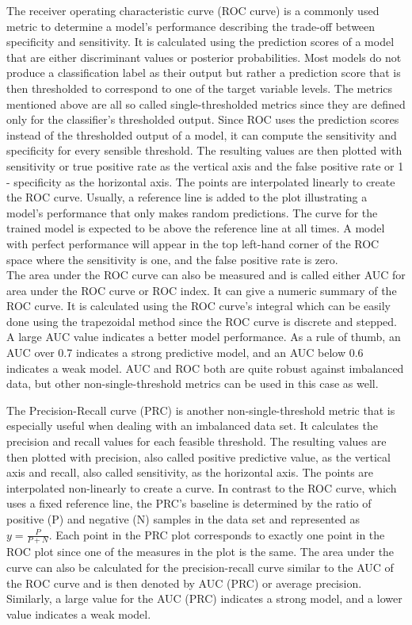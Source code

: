 The receiver operating characteristic curve (ROC curve) is a commonly used 
metric to determine a model's performance describing the trade-off between 
specificity and sensitivity. It is calculated using the prediction scores of a 
model that are either discriminant values or posterior 
probabilities.\cite{RN161} Most models do not produce a classification label as 
their output but rather a prediction score that is then thresholded to 
correspond 
to one of the target variable levels. The metrics mentioned above are all 
so called single-thresholded metrics since they are defined only for the 
classifier's thresholded output.\cite{RN161, RN167} Since ROC uses the 
prediction scores instead of the thresholded output of a model, it can compute 
the sensitivity and specificity for every sensible threshold. The resulting 
values are then plotted with sensitivity or true positive rate as the vertical 
axis and the false positive rate or 1 - specificity as the 
horizontal axis. The points are interpolated linearly to create the ROC curve. 
\cite{RN161} Usually, a reference line is added to the plot illustrating a 
model's performance that only makes random predictions. The curve for the 
trained model is expected to be above the reference line at all times. 
A model with perfect performance will appear in the top left-hand corner 
of the ROC space where the sensitivity is one, and the false positive rate is 
zero.\cite{RN167, RN159}
\\
The area under the ROC curve can also be measured and is called either AUC for 
area under the ROC curve or ROC index. It can give a numeric summary of the ROC 
curve. It is calculated using the ROC curve's integral which can be easily 
done using the trapezoidal method since the ROC curve is discrete and stepped. 
A large AUC value indicates a better model performance. As a rule of thumb, an 
AUC over 0.7 indicates a strong predictive model, and an AUC below 0.6 
indicates 
a weak model. AUC and ROC both are quite robust against imbalanced data, but 
other non-single-threshold metrics can be used in this case as 
well.\cite{RN167, RN159}
\par
The Precision-Recall curve (PRC) is another non-single-threshold metric that is 
especially useful when dealing with an imbalanced data set. It calculates the 
precision and recall values for each feasible threshold. The 
resulting values are then plotted with precision, also called positive 
predictive value, as the vertical axis and recall, also called sensitivity, as 
the horizontal axis. The points are interpolated non-linearly to create a 
curve. 
In contrast to the ROC curve, which uses a fixed reference line, the PRC's 
baseline is determined by the ratio of positive (P) and negative (N) samples in 
the data set and represented as $y = \frac{P}{P + N}$. Each point in the PRC 
plot corresponds to exactly one point in the ROC plot since one of the measures 
in the plot is the same. The area under the curve can also be 
calculated for the precision-recall curve similar to the AUC of the ROC curve 
and is then denoted by AUC (PRC) or average precision. Similarly, a large value 
for the AUC (PRC) indicates a strong model, and a lower value indicates a weak 
model.\cite{RN160, RN161}

